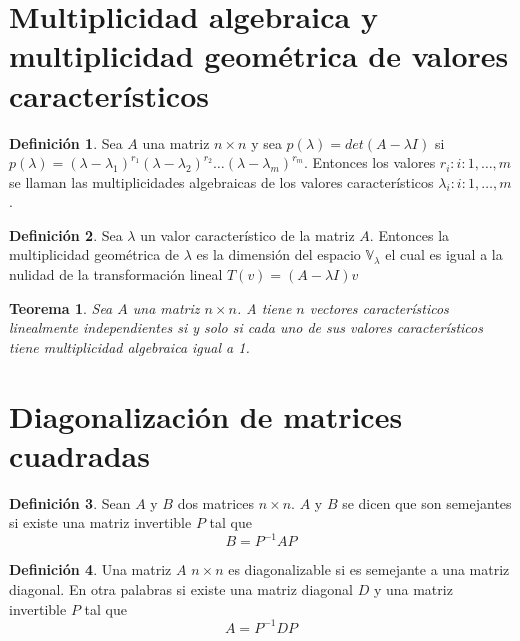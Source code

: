 \documentclass[10pt,a4paper]{report}
\newtheorem{theorem}{Teorema}[chapter]
\newtheorem{lemma}[theorem]{Lema}
\theoremstyle{definition}
\newtheorem{dfn}{Definición}[chapter]
\newtheorem{ejemplo}{Ejemplo}[chapter]
\newtheorem{ejercicio}{Ejercicio}[chapter]
\theoremstyle{remark}
\numberwithin{section}{chapter}
\numberwithin{equation}{chapter}
\numberwithin{tacounter}{chapter}
\begin{document}
\section{Multiplicidad algebraica y multiplicidad geométrica de valores característicos}
\begin{dfn}
Sea $A$ una matriz $n \times n$ y sea $p(\lambda) = det (A - \lambda I)$ si $p(\lambda) = (\lambda - \lambda_1)^{r_1} (\lambda - \lambda_2)^{r_2} \ldots (\lambda- \lambda_m)^{r_m}$. Entonces los valores $r_i : i : 1, \ldots, m$ se llaman las multiplicidades algebraicas de los valores característicos $\lambda_i : i:1, \ldots, m$.
\end{dfn}

\begin{dfn}
Sea $\lambda$ un valor característico de la matriz $A$. Entonces la multiplicidad geométrica de $\lambda$ es la dimensión del espacio $\mathbb{V}_{\lambda}$ el cual es igual a la nulidad de la transformación lineal $T(v) = (A- \lambda I)v$
\end{dfn}

\begin{theorem}
Sea $A$ una matriz $n \times n$. A tiene $n$ vectores característicos linealmente independientes si y solo si cada uno de sus valores característicos tiene multiplicidad algebraica igual a 1.
\end{theorem}

\section{Diagonalización de matrices cuadradas}
\begin{dfn}
Sean $A$ y $B$ dos matrices $n \times n$. $A$ y $B$ se dicen que son semejantes si existe una matriz invertible $P$ tal que 
$$B= P^{-1} AP$$
\end{dfn}

\begin{dfn}
Una matriz $A$ $n \times n$ es diagonalizable si es semejante a una matriz diagonal. En otra palabras si existe una matriz diagonal $D$ y una matriz invertible $P$ tal que 
$$A=P^{-1}DP$$
\end{dfn}



%
%
%
%
%

\end{document}
